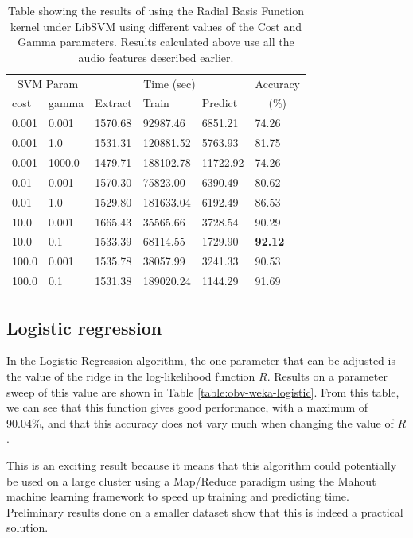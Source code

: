 \documentclass[12pt,oneside]{book}
\begin{document}
\begin{table}
\begin{tabular}{|l|l|l|l|l|l|}
\hline
\multicolumn{2}{|c|}{SVM Param} & \multicolumn{3}{c|}{Time (sec)} & Accuracy \\
\hhline{|-|-|-|-|-|~|}
cost & gamma & Extract & Train & Predict & \multicolumn{1}{c|}{(\%)} \\
\hhline{|=|=|=|=|=|=|}
 0.001  & 0.001   &  1570.68  &   92987.46  &   6851.21  &  74.26  \\
 0.001  & 1.0     &  1531.31  &  120881.52  &   5763.93  &  81.75  \\
 0.001  & 1000.0  &  1479.71  &  188102.78  &  11722.92  &  74.26  \\
 0.01   & 0.001   &  1570.30  &   75823.00  &   6390.49  &  80.62  \\
 0.01   & 1.0     &  1529.80  &  181633.04  &   6192.49  &  86.53  \\
 10.0   & 0.001   &  1665.43  &   35565.66  &   3728.54  &  90.29  \\
 10.0   & 0.1     &  1533.39  &   68114.55  &   1729.90  &  \textbf{92.12}  \\
 100.0  & 0.001   &  1535.78  &   38057.99  &   3241.33  &  90.53  \\
 100.0  & 0.1     &  1531.38  &  189020.24  &   1144.29  &  91.69  \\
\hline
\end{tabular}
\caption{Table showing the results of using the Radial Basis Function
  kernel under LibSVM using different values of the Cost and Gamma
  parameters.  Results calculated above use all the audio features
  described earlier.}
\label{table:obv-libsvm-rbf}
\end{table}



%
%
\subsection{Logistic regression}


In the Logistic Regression algorithm, the one parameter that can be
adjusted is the value of the ridge in the log-likelihood function $R$.
Results on a parameter sweep of this value are shown in Table
\ref{table:obv-weka-logistic}.  From this table, we can see that this
function gives good performance, with a maximum of 90.04\%, and that
this accuracy does not vary much when changing the value of $R$.

This is an exciting result because it means that this algorithm could
potentially be used on a large cluster using a Map/Reduce paradigm
using the Mahout \cite{owen2011mahout} machine learning framework to
speed up training and predicting time.  Preliminary results done on a
smaller dataset show that this is indeed a practical solution.
\end{document}
